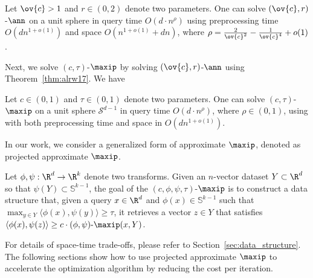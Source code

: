 \begin{theorem}\label{thm:alrw17}
Let $\ov{c} > 1$ and $r \in (0,2)$ denote two parameters. One can solve $(\ov{c},r)$-$\ann$ on a unit sphere in query time $O(d \cdot n^{\rho})$ using preprocessing time $O(dn^{1+o(1)})$ and space $O(n^{1+o(1)} + d n)$, where $\rho = \frac{2}{\ov{c}^2} -\frac{1}{\ov{c}^4}+o(1)$.
\end{theorem}

Next, we solve $(c,\tau)$-{$\maxip$} by solving  $(\ov{c},r)$-{$\ann$} using Theorem~\ref{thm:alrw17}. We have 

\begin{corollary}\label{coro:maxip_lsh_informal}
Let $c \in (0,1)$ and $\tau \in (0,1)$ denote two parameters. One can solve $(c,\tau)$-{$\maxip$} on a unit sphere $\mathcal{S}^{d-1}$ in query time $O(d \cdot n^{\rho})$, where $\rho\in(0,1)$, using {\lsh} with both preprocessing time and space in $O(d n^{1+o(1)})$.
\end{corollary}

In our work, we consider a generalized form of approximate $\maxip$, denoted as projected approximate $\maxip$.

\begin{definition}\label{def:proj_approximate_maxip_informal}
Let $\phi, \psi: \R^d \rightarrow \R^k$ denote two transforms. Given an $n$-vector dataset $Y \subset \R^d $ so that $\psi(Y) \subset \mathbb{S}^{k-1}$, the goal of the $(c,\phi, \psi,\tau)$-{$\maxip$} is to construct a data structure that, given a query $x\in \R^d$ and $\phi(x) \in \mathbb{S}^{k-1}$ such that $\max_{y\in Y}\langle \phi(x) , \psi(y) \rangle \geq \tau$, it retrieves a vector $z \in Y$ that satisfies $\langle \phi(x) , \psi(z) \rangle \geq c \cdot (\phi, \psi)\text{-}\maxip (x,Y)$.
\end{definition}

For details of space-time trade-offs, please refer to Section~\ref{sec:data_structure}. The following sections show how to use projected approximate $\maxip$ to accelerate the optimization algorithm by reducing the cost per iteration.
\fi

\iffalse
\begin{definition}[Regularized $\minip$]\label{def:reg_minip} 
Given a data set $Y\subseteq \R^d$ and a point $x\in\R^d$. Let $\phi:\R^d\rightarrow \R^d$ denote a mapping. Given a constant $\alpha$, we define regularized $\minip$ as follows:
\begin{align*}
    (\phi,\alpha)\text{-}\minip (x,Y) := \min_{y \in Y} \langle y-x,\phi(x) \rangle + \alpha\|x-y\|.
\end{align*}
\end{definition}
\fi




